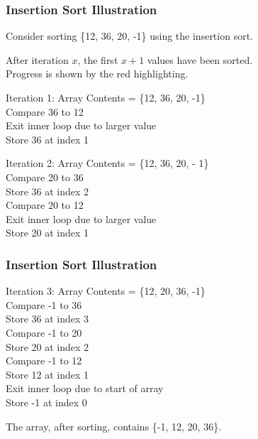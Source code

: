 \begin{frame}
\frametitle{Insertion Sort Illustration}

Consider sorting \{12, 36, 20, -1\} using the insertion sort.

After iteration $x$, the first $x+1$ values have been sorted.\\
\quad Progress is shown by the red highlighting.

Iteration 1: Array Contents = \{12, 36, 20, -1\}\\
\quad Compare 36 to 12\\
\quad Exit inner loop due to larger value\\
\quad Store 36 at index 1

Iteration 2: Array Contents = \{\alert{12}, \alert{36}, 20, - 1\}\\
\quad Compare 20 to 36\\
\quad Store 36 at index 2\\
\quad Compare 20 to 12\\
\quad Exit inner loop due to larger value\\
\quad Store 20 at index 1


\end{frame}

\begin{frame}
\frametitle{Insertion Sort Illustration}

Iteration 3: Array Contents = \{\alert{12}, \alert{20}, \alert{36}, -1\}\\
\quad Compare -1 to 36 \\
\quad Store 36 at index 3\\
\quad Compare -1 to 20\\
\quad Store 20 at index 2\\
\quad Compare -1 to 12\\
\quad Store 12 at index 1\\
\quad Exit inner loop due to start of array\\
\quad Store -1 at index 0

The array, after sorting, contains \{-1, 12, 20, 36\}.

\end{frame}

